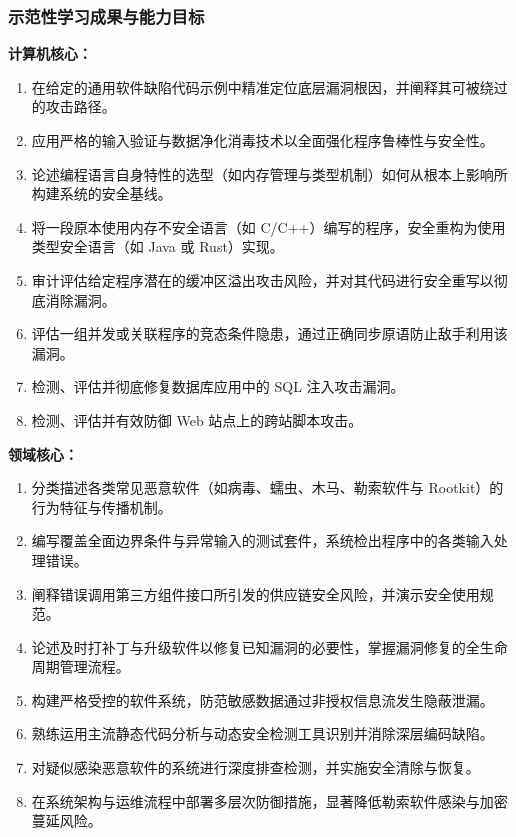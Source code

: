 \subsubsection{示范性学习成果与能力目标}
\textbf{计算机核心：}
\begin{enumerate}\setlength{\itemsep}{0pt}\setlength{\parskip}{0pt}
    \item 在给定的通用软件缺陷代码示例中精准定位底层漏洞根因，并阐释其可被绕过的攻击路径。
    \item 应用严格的输入验证与数据净化消毒技术以全面强化程序鲁棒性与安全性。
    \item 论述编程语言自身特性的选型（如内存管理与类型机制）如何从根本上影响所构建系统的安全基线。
    \item 将一段原本使用内存不安全语言（如 C/C++）编写的程序，安全重构为使用类型安全语言（如 Java 或 Rust）实现。
    \item 审计评估给定程序潜在的缓冲区溢出攻击风险，并对其代码进行安全重写以彻底消除漏洞。
    \item 评估一组并发或关联程序的竞态条件隐患，通过正确同步原语防止敌手利用该漏洞。
    \item 检测、评估并彻底修复数据库应用中的 SQL 注入攻击漏洞。
    \item 检测、评估并有效防御 Web 站点上的跨站脚本攻击。
\end{enumerate}
\textbf{领域核心：}
\begin{enumerate}\setlength{\itemsep}{0pt}\setlength{\parskip}{0pt}\setcounter{enumi}{8}
    \item 分类描述各类常见恶意软件（如病毒、蠕虫、木马、勒索软件与 Rootkit）的行为特征与传播机制。
    \item 编写覆盖全面边界条件与异常输入的测试套件，系统检出程序中的各类输入处理错误。
    \item 阐释错误调用第三方组件接口所引发的供应链安全风险，并演示安全使用规范。
    \item 论述及时打补丁与升级软件以修复已知漏洞的必要性，掌握漏洞修复的全生命周期管理流程。
    \item 构建严格受控的软件系统，防范敏感数据通过非授权信息流发生隐蔽泄漏。
    \item 熟练运用主流静态代码分析与动态安全检测工具识别并消除深层编码缺陷。
    \item 对疑似感染恶意软件的系统进行深度排查检测，并实施安全清除与恢复。
    \item 在系统架构与运维流程中部署多层次防御措施，显著降低勒索软件感染与加密蔓延风险。
\end{enumerate}

